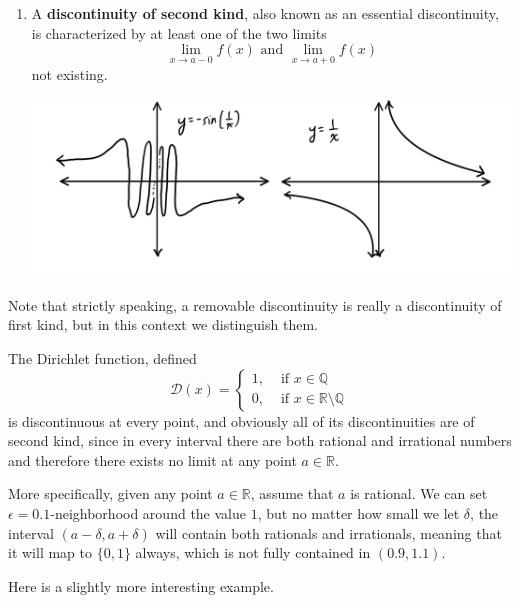 \documentclass{article}
\begin{document}
\begin{definition}[Discontinuity]
\begin{enumerate}
\begin{center}
        \end{center}
        \item A \textbf{discontinuity of second kind}, also known as an essential discontinuity, is characterized by at least one of the two limits 
        \[\lim_{x \rightarrow a-0} f(x) \text{ and } \lim_{x \rightarrow a+0} f(x)\]
        not existing. 
        \begin{center}
            \includegraphics[scale=0.23]{img/Discontinuity_Second.PNG}
        \end{center}
      \end{enumerate}
      Note that strictly speaking, a removable discontinuity is really a discontinuity of first kind, but in this context we distinguish them. 
    \end{definition}

    \begin{example}
      The Dirichlet function, defined
      \[\mathcal{D}(x) = \begin{cases}
      1, & \text{ if } x \in \mathbb{Q} \\
      0, & \text{ if } x \in \mathbb{R} \setminus \mathbb{Q} 
      \end{cases}\]
      is discontinuous at every point, and obviously all of its discontinuities are of second kind, since in every interval there are both rational and irrational numbers and therefore there exists no limit at any point $a \in \mathbb{R}$. 

      More specifically, given any point $a \in \mathbb{R}$, assume that $a$ is rational. We can set $\epsilon = 0.1$-neighborhood around the value $1$, but no matter how small we let $\delta$, the interval $(a - \delta, a + \delta)$ will contain both rationals and irrationals, meaning that it will map to $\{0,1\}$ always, which is not fully contained in $(0.9, 1.1)$.  
    \end{example}

    Here is a slightly more interesting example. 
\end{document}
